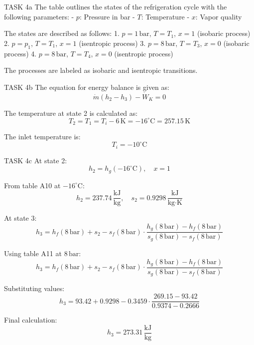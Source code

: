TASK 4a  
The table outlines the states of the refrigeration cycle with the following parameters:  
- \( p \): Pressure in bar  
- \( T \): Temperature  
- \( x \): Vapor quality  

The states are described as follows:  
1. \( p = 1 \, \text{bar} \), \( T = T_1 \), \( x = 1 \) (isobaric process)  
2. \( p = p_1 \), \( T = T_1 \), \( x = 1 \) (isentropic process)  
3. \( p = 8 \, \text{bar} \), \( T = T_3 \), \( x = 0 \) (isobaric process)  
4. \( p = 8 \, \text{bar} \), \( T = T_4 \), \( x = 0 \) (isentropic process)  

The processes are labeled as isobaric and isentropic transitions.  

TASK 4b  
The equation for energy balance is given as:  
\[
\dot{m} (h_2 - h_3) - \dot{W}_K = 0
\]

The temperature at state 2 is calculated as:  
\[
T_2 = T_1 = T_i - 6 \, \text{K} = -16^\circ\text{C} = 257.15 \, \text{K}
\]

The inlet temperature is:  
\[
T_i = -10^\circ\text{C}
\]

TASK 4c  
At state 2:  
\[
h_2 = h_g(-16^\circ\text{C}), \quad x = 1
\]

From table A10 at \( -16^\circ\text{C} \):  
\[
h_2 = 237.74 \, \frac{\text{kJ}}{\text{kg}}, \quad s_2 = 0.9298 \, \frac{\text{kJ}}{\text{kg·K}}
\]

At state 3:  
\[
h_3 = h_f(8 \, \text{bar}) + s_2 - s_f(8 \, \text{bar}) \cdot \frac{h_g(8 \, \text{bar}) - h_f(8 \, \text{bar})}{s_g(8 \, \text{bar}) - s_f(8 \, \text{bar})}
\]

Using table A11 at \( 8 \, \text{bar} \):  
\[
h_3 = h_f(8 \, \text{bar}) + s_2 - s_f(8 \, \text{bar}) \cdot \frac{h_g(8 \, \text{bar}) - h_f(8 \, \text{bar})}{s_g(8 \, \text{bar}) - s_f(8 \, \text{bar})}
\]

Substituting values:  
\[
h_3 = 93.42 + 0.9298 - 0.3459 \cdot \frac{269.15 - 93.42}{0.9374 - 0.2666}
\]

Final calculation:  
\[
h_3 = 273.31 \, \frac{\text{kJ}}{\text{kg}}
\]